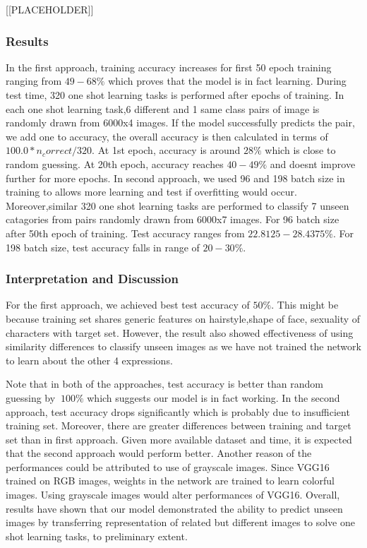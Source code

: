 \documentclass{article}
\begin{document}
[[PLACEHOLDER]]

\subsubsection{\textbf{Results}}

In the first approach, training accuracy increases for first 50 epoch training ranging from $49-68\%$ which proves that the model is in fact learning. During test time, 320 one shot learning tasks is performed after epochs of training. In each one shot learning task,6 different and 1 same class pairs of image is randomly drawn from 6000x4 images. If the model successfully predicts the pair, we add one to accuracy, the overall accuracy is then calculated in terms of $100.0*n_correct / 320$. At 1st epoch, accuracy is around $28\%$ which is close to random guessing. At 20th epoch, accuracy reaches $40-49\%$ and doesnt improve further for more epochs. In second approach, we used 96 and 198 batch size in training to allows more learning and test if overfitting would occur. Moreover,similar 320 one shot learning tasks are performed to classify 7 unseen catagories from pairs randomly drawn from 6000x7 images. For 96 batch size after 50th epoch of training. Test accuracy ranges from $22.8125-28.4375\%$. For 198 batch size, test accuracy falls in range of $20-30\%$.

\subsubsection{\textbf{Interpretation and Discussion}}

For the first approach, we achieved best test accuracy of $50\%$. This might be because training set shares generic features on hairstyle,shape of face, sexuality of characters with target set. However, the result also showed effectiveness of using similarity differences to classify unseen images as we have not trained the network to learn about the other 4 expressions.

Note that in both of the approaches, test accuracy is better than random guessing by $~100\%$ which suggests our model is in fact working. In the second approach, test accuracy drops significantly which is probably due to insufficient training set. Moreover, there are greater differences between training and target set than in first approach. Given more available dataset and time, it is expected that the second approach would perform better. Another reason of the performances could be attributed to use of grayscale images. Since VGG16 trained on RGB images, weights in the network are trained to learn colorful images. Using grayscale images would alter performances of VGG16. Overall, results have shown that our model demonstrated the ability to predict unseen images by transferring representation of related but different images to solve one shot learning tasks, to preliminary extent. 
\end{document}
